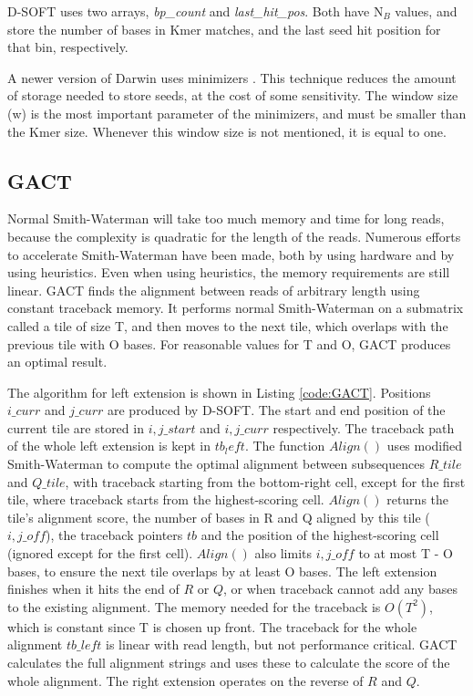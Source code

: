 \documentclass[../main/thesis.tex]{subfiles}
\begin{document}
D-SOFT uses two arrays, \textit{bp\_count} and \textit{last\_hit\_pos}.
Both have N$_{B}$ values, and store the number of bases in Kmer matches, and the last seed hit position for that bin, respectively.

A newer version of Darwin uses minimizers \cite{minimizers}.
This technique reduces the amount of storage needed to store seeds, at the cost of some sensitivity.
The window size (w) is the most important parameter of the minimizers, and must be smaller than the Kmer size.
Whenever this window size is not mentioned, it is equal to one.

\subsection{GACT}
Normal Smith-Waterman will take too much memory and time for long reads, because the complexity is quadratic for the length of the reads.
Numerous efforts to accelerate Smith-Waterman have been made, both by using hardware and by using heuristics.
Even when using heuristics, the memory requirements are still linear.
GACT finds the alignment between reads of arbitrary length using constant traceback memory.
It performs normal Smith-Waterman on a submatrix called a tile of size T, and then moves to the next tile, which overlaps with the previous tile with O bases.
For reasonable values for T and O, GACT produces an optimal result.

The algorithm for left extension is shown in Listing \ref{code:GACT}.
Positions $i\_curr$ and $j\_curr$ are produced by D-SOFT.
The start and end position of the current tile are stored in $i,j\_start$ and $i,j\_curr$ respectively.
The traceback path of the whole left extension is kept in $tb_left$.
The function $Align()$ uses modified Smith-Waterman to compute the optimal alignment between subsequences $R\_tile$ and $Q\_tile$, with traceback starting from the bottom-right cell, except for the first tile, where traceback starts from the highest-scoring cell.
$Align()$ returns the tile's alignment score, the number of bases in R and Q aligned by this tile ($i,j\_off$), the traceback pointers $tb$ and the position of the highest-scoring cell (ignored except for the first cell).
$Align()$ also limits $i,j\_off$ to at most T - O bases, to ensure the next tile overlaps by at least O bases.
The left extension finishes when it hits the end of $R$ or $Q$, or when traceback cannot add any bases to the existing alignment.
The memory needed for the traceback is $O(T^2)$, which is constant since T is chosen up front.
The traceback for the whole alignment $tb\_left$ is linear with read length, but not performance critical.
GACT calculates the full alignment strings and uses these to calculate the score of the whole alignment.
The right extension operates on the reverse of $R$ and $Q$.
\end{document}
